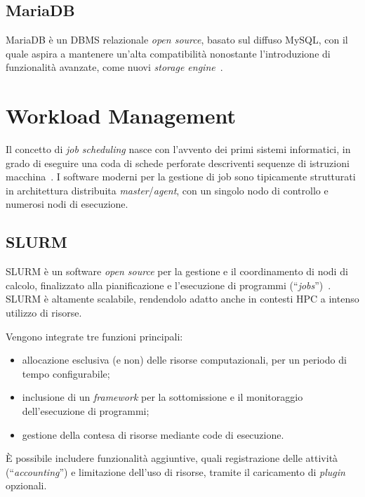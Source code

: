 \documentclass[12pt,a4paper,twoside,openright]{book}
\begin{document}
\subsection{MariaDB}
Maria\acs{DB} è un \ac{DBMS} relazionale \textit{open source}, basato sul diffuso My\ac{SQL}, con il quale aspira a mantenere un'alta compatibilità nonostante l'introduzione di funzionalità avanzate, come nuovi \textit{storage engine}~\cite{mariadbwiki}.

\section{Workload Management}
Il concetto di \textit{job scheduling} nasce con l'avvento dei primi sistemi informatici, in grado di eseguire una coda di schede perforate descriventi sequenze di istruzioni macchina~\cite{jobschedwiki}. I software moderni per la gestione di job sono tipicamente strutturati in architettura distribuita \textit{master}/\textit{agent}, con un singolo nodo di controllo e numerosi nodi di esecuzione.

\subsection{SLURM}
\acf{SLURM} è un software \textit{open source} per la gestione e il coordinamento di nodi di calcolo, finalizzato alla pianificazione e l'esecuzione di programmi (``\textit{jobs}'')~\cite{slurmoverview}. \ac{SLURM} è altamente scalabile, rendendolo adatto anche in contesti \acf{HPC} a intenso utilizzo di risorse.

Vengono integrate tre funzioni principali:
\begin{itemize}
    \item allocazione esclusiva (e non) delle risorse computazionali, per un periodo di tempo configurabile;
    \item inclusione di un \textit{framework} per la sottomissione e il monitoraggio dell'esecuzione di programmi;
    \item gestione della contesa di risorse mediante code di esecuzione.
\end{itemize}
È possibile includere funzionalità aggiuntive, quali registrazione delle attività (``\textit{accounting}'') e limitazione dell'uso di risorse, tramite il caricamento di \textit{plugin} opzionali.
\end{document}
